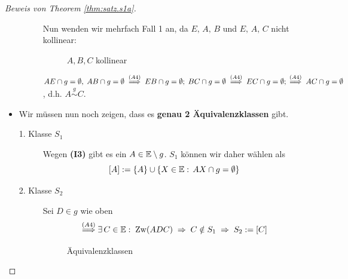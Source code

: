\begin{proof}[Beweis von Theorem \ref{thm:satz.s1a}]
\begin{itemize}
\begin{description}

                Nun wenden wir mehrfach Fall 1 an, da  $E,\,A,\,B$ und  $E,\,A,\,C$ nicht kollinear:

                \begin{figure}[ht]
                    
                    \caption{$A, B, C$ kollinear}
                \end{figure}

                ${AE} \cap g = \emptyset,\; {AB} \cap g=\emptyset\;
                \stackrel{(A4)}{\Longrightarrow}\; {EB} \cap g = \emptyset;\; {BC}\cap g =
                \emptyset\; \stackrel{(A4)}{\Longrightarrow}\; {EC} \cap g = \emptyset;\;
                \stackrel{(A4)}{\Longrightarrow}\; {AC} \cap g = \emptyset$, d.h.
                $A\stackrel{g}{\sim} C$.
        \end{description}

        \item Wir müssen nun noch zeigen, dass es {\bf genau 2 Äquivalenzklassen} gibt.
        \begin{description}
            \item[1. Klasse $S_1$] Wegen \textbf{(I3)} gibt es ein $A \in \mathbb E \setminus g$. $S_1$
                können wir daher wählen als
                $$
                    [A] := \{ A \} \cup \{ X \in \mathbb E:\, {AX} \cap g = \emptyset \}
                $$
            \item[2. Klasse $S_2$] Sei $D\in g$ wie oben
                $$
                    \stackrel{(A4)}{\Longrightarrow} \exists\, C \in \mathbb E:\; \operatorname{Zw}(ADC)\; \Rightarrow\;
                    C \notin S_1\; \Rightarrow\; S_2 := [C]
                $$

                \begin{figure}[ht]
                    
                    \caption{Äquivalenzklassen}
                \end{figure}
        \end{description}


\end{itemize}
\end{proof}
